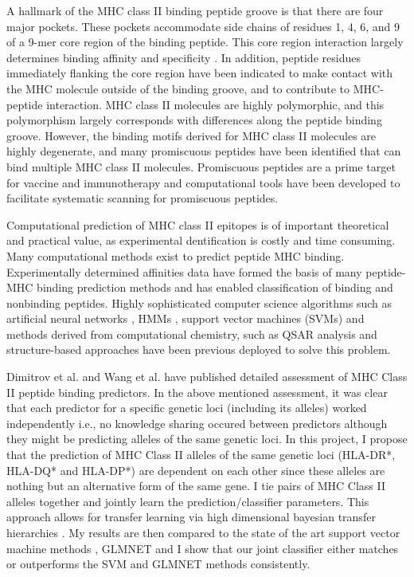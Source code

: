 \documentclass[conference,10pt,draftclsnofoot,onecolumn]{IEEEtran}
\begin{document}
A hallmark of the MHC class II binding peptide groove is that there are four major pockets. These pockets accommodate side chains of
residues 1, 4, 6, and 9 of a 9-mer core region of the binding peptide. This core region interaction largely determines binding affinity
and specificity \cite{jones06}. In addition, peptide residues immediately flanking the core region have been indicated to make contact with the
MHC molecule outside of the binding groove, and to contribute to MHC-peptide interaction.  MHC class II molecules are highly polymorphic, and this
polymorphism largely corresponds with differences along the peptide binding groove. However, the binding motifs derived for
MHC class II molecules are highly degenerate, and many promiscuous peptides have been identified that can bind multiple
MHC class II molecules. Promiscuous peptides are a prime target for vaccine and immunotherapy and computational tools
have been developed to facilitate systematic scanning for promiscuous peptides.

Computational prediction of MHC class II epitopes is of important theoretical and practical value, as experimental dentification
is costly and time consuming. Many computational methods exist to predict peptide MHC binding. Experimentally determined affinities
data have formed the basis of many peptide-MHC binding prediction methods and has enabled classification of binding and
nonbinding peptides. Highly sophisticated computer science algorithms such as artificial neural networks \cite{gulukota00},
HMMs \cite{noguchi02}, support vector machines (SVMs) \cite{wan06} and methods derived from computational chemistry,
such as QSAR analysis \cite{doytchinova05} and structure-based approaches \cite{davies06} have been previous deployed to solve this problem.

Dimitrov et al. \cite{dimitrov10} and Wang et al. \cite{wang08} have published detailed assessment of MHC Class II peptide binding
predictors. In the above mentioned assessment, it was clear that each predictor for a specific genetic loci (including its alleles)
worked independently i.e., no knowledge sharing occured between predictors although they might be predicting alleles of the same genetic loci.
In this project, I propose that the prediction of MHC Class II alleles of the same genetic loci (HLA-DR*, HLA-DQ* and HLA-DP*) are dependent
on each other since these alleles are nothing but an alternative form of the same gene. I tie pairs of MHC Class II alleles together and jointly
learn the prediction/classifier parameters. This approach allows for transfer learning via high dimensional bayesian transfer hierarchies \cite{elidan08}.
My results are then compared to the state of the art support vector machine methods \cite{wan06}, GLMNET \cite{friedman09}
and I show that our joint classifier either matches or outperforms the SVM and GLMNET methods consistently.
\end{document}
